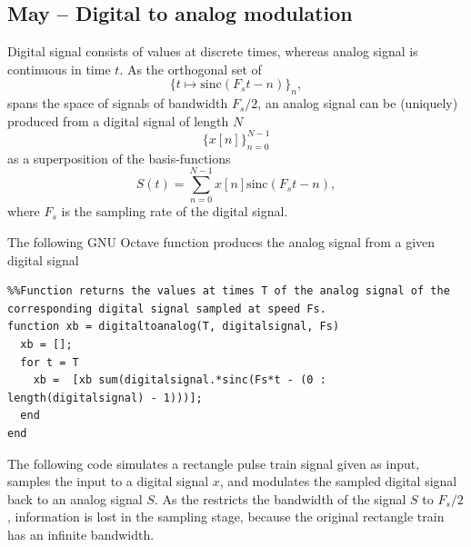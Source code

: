 \documentclass{article}
\begin{document}






\subsection{May – Digital to analog modulation}
Digital signal consists of values at discrete times, whereas analog signal is continuous in time $t$. As the orthogonal set of 
$$
\{t \mapsto \text{sinc}(F_s t - n)\}_n,
$$
spans the space of signals of bandwidth $F_s/2$, an analog signal can be (uniquely) produced from a digital signal of length $N$ 
$$
\{ x[n]\}_{n=0}^{N-1}
$$
as a superposition of the  basis-functions
$$
S(t) =\sum_{n = 0}^{N-1} x[n]\text{sinc}(F_s t - n),
$$
where $F_s$ is the sampling rate of the digital signal.

The following GNU Octave function produces the analog signal from a given digital signal

\begin{verbatim}
%%Function returns the values at times T of the analog signal of the corresponding digital signal sampled at speed Fs.
function xb = digitaltoanalog(T, digitalsignal, Fs)
  xb = [];
  for t = T
    xb =  [xb sum(digitalsignal.*sinc(Fs*t - (0 : length(digitalsignal) - 1)))];
  end
end
\end{verbatim}

The following code simulates a rectangle pulse train signal given as input, samples the input to a digital signal $x$, and modulates the sampled digital signal back to an analog signal $S$. As the  restricts the bandwidth of the signal $S$ to $F_s/2$, information is lost in the sampling stage, because the original rectangle train has an infinite bandwidth.
\end{document}
